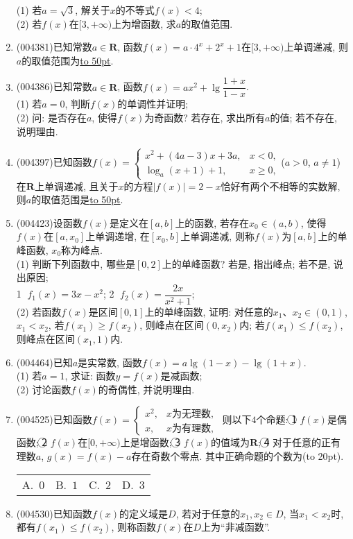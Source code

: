 \documentclass[10pt,a4paper]{article}
\newcommand{\blank}[1]{\underline{\hbox to #1pt{}}}
\newcommand{\bracket}[1]{(\hbox to #1pt{})}
\newcommand{\fourch}[4]{\par\begin{tabular}{p{.23\textwidth}p{.23\textwidth}p{.23\textwidth}p{.23\textwidth}}
A.~#1 &B.~#2& C.~#3& D.~#4
\end{tabular}}
\begin{document}
\begin{enumerate}[1.]
(1) 若$a=\sqrt 3$, 解关于$x$的不等式$f(x)<4$;\\
(2) 若$f(x)$在$[3,+\infty)$上为增函数, 求$a$的取值范围.
\item {\tiny (004381)}已知常数$a\in \mathbf{R}$, 函数$f(x)=a\cdot 4^x+2^x+1$在$[3,+\infty)$上单调递减, 则$a$的取值范围为\blank{50}.
\item {\tiny (004386)}已知常数$a\in \mathbf{R}$, 函数$f(x)=ax^2+\lg \dfrac{1+x}{1-x}$.\\
(1) 若$a=0$, 判断$f(x)$的单调性并证明;\\
(2) 问: 是否存在$a$, 使得$f(x)$为奇函数? 若存在, 求出所有$a$的值; 若不存在, 说明理由.
\item {\tiny (004397)}已知函数$f(x)=\begin{cases}  x^2+(4a-3)x+3a,& x<0, \\ \log_a(x+1)+1,& x\ge 0, \end{cases}$($a>0$, $a\ne 1$)在$\mathbf{R}$上单调递减, 且关于$x$的方程$|f(x)|=2-x$恰好有两个不相等的实数解, 则$a$的取值范围是\blank{50}.
\item {\tiny (004423)}设函数$f(x)$是定义在$[a,b]$上的函数, 若存在$x_0\in (a,b)$, 使得$f(x)$在$[a,x_0]$上单调递增, 在$[x_0,b]$上单调递减, 则称$f(x)$为$[a,b]$上的单峰函数, $x_0$称为峰点.\\
(1) 判断下列函数中, 哪些是$[0,2]$上的单峰函数? 若是, 指出峰点; 若不是, 说出原因;\\
\textcircled{1}  $f_1(x)=3x-x^2$; \textcircled{2}  $f_2(x)=\dfrac{2x}{{x^2}+1}$;\\
(2) 若函数$f(x)$是区间$[0,1]$上的单峰函数, 证明: 对任意的$x_1$、$x_2\in (0,1)$, $x_1<x_2$, 若$f(x_1)\ge f(x_2)$, 则峰点在区间$(0,x_2)$内; 若$f(x_1)\le f(x_2)$, 则峰点在区间$(x_1,1)$内.
\item {\tiny (004464)}已知$a$是实常数, 函数$f(x)=a\lg(1-x)-\lg (1+x)$.\\
(1) 若$a=1$, 求证: 函数$y=f(x)$是减函数;\\
(2) 讨论函数$f(x)$的奇偶性, 并说明理由.
\item {\tiny (004525)}已知函数$f(x)=\begin{cases} x^2, & x\text{为无理数}, \\ x, &x\text{为有理数},   \end{cases}$ 则以下$4$个命题:
\textcircled{1} $f(x)$是偶函数; \textcircled{2} $f(x)$在$[0,+\infty)$上是增函数; \textcircled{3} $f(x)$的值域为$\mathbf{R}$; \textcircled{4} 对于任意的正有理数$a$, $g(x)=f(x)-a$存在奇数个零点.
其中正确命题的个数为\bracket{20}.
\fourch{$0$}{$1$}{$2$}{$3$}
\item {\tiny (004530)}已知函数$f(x)$的定义域是$D$, 若对于任意的$x_1,x_2\in D$, 当$x_1<x_2$时, 都有$f(x_1)\le f(x_2)$, 则称函数$f(x)$在$D$上为``非减函数''.\\

\end{enumerate}
\end{document}

